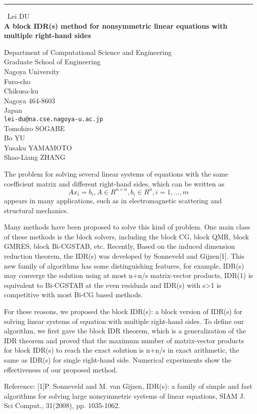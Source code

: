 \documentclass{report}
\begin{document}
\begin{center}
\rule{6in}{1pt} \
{\large Lei DU \\
{\bf A block IDR(s) method for nonsymmetric linear equations with multiple right-hand sides}}

Department of Computational Science and Engineering \\ Graduate School of Engineering \\ Nagoya University \\ Furo-cho \\ Chikusa-ku \\ Nagoya 464-8603 \\ Japan
\\
{\tt lei-du@na.cse.nagoya-u.ac.jp}\\
Tomohiro SOGABE\\
Bo YU\\
Yusaku YAMAMOTO\\
Shao-Liang ZHANG\end{center}

The problem for solving several linear systems of equations with the same
coefficient matrix and different right-hand sides, which can be written
as
$$Ax_i=b_i, A\in R^{n\times n}, b_i\in R^n, i=1,...,m$$
appears in many applications, such as in electromagnetic scattering and
structural mechanics.

Many methods have been proposed to solve this kind of problem. One main
class of these methods is the block solvers, including the block CG,
block QMR, block GMRES, block Bi-CGSTAB, etc.
Recently, Based on the induced dimension reduction theorem, the IDR(s)
was developed by Sonneveld and Gijzen[1]. This new family of algorithms
has some distinguishing features, for example, IDR(s) may converge the
solution using at most n+n/s matrix-vector products, IDR(1) is equivalent
to Bi-CGSTAB at the even residuals and IDR(s) with s>1 is competitive
with most Bi-CG based methods.

For these reasons, we proposed the block IDR(s): a block version of
IDR(s) for solving linear systems of equation with multiple right-hand
sides. To define our algorithm, we first gave the block IDR theorem,
which is a generalization of the IDR theorem and proved that the maximum
number of matrix-vector products for block IDR(s) to reach the exact
solution is n+n/s in exact arithmetic, the same as IDR(s) for single
right-hand side. Numerical experiments show the effectiveness of our
proposed method.

Reference:
[1]P. Sonneveld and M. van Gijzen, IDR(s): a family of simple and fast
algorithms for solving large nonsymmetric systems of linear equations,
SIAM J. Sci Comput., 31(2008), pp. 1035-1062.
\end{document}
